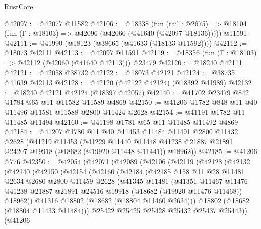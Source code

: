 \begin{lexlean}{RustCore}
\begin{coremodule}
@42097 := @42077 @11582
@42106 := @18338
    (fun (tail : @2675) => @18104 (fun (Γ : @18103) => @42096 (@42060 (@41640 (@42097 @18136)))))
    @11591
@42111 := @41990 (@18123 (@38665 (@41633 (@18133 @11592))))
@42112 := @18073 @42111
@42113 := @42097 @11591
@42119 := @18356 (fun (Γ : @18103) => @42112 (@42060 (@41640 @42113))) @23479
@42120 := @18240 @42111
@42121 := @42058 @38732
@42122 := @18073 @42121
@42124 := @38735 @41639 @42113
@42128 := @42120 (@42122 @42124) (@18392 @41989)
@42132 := @18240 @42121 @42124 (@18397 @42057)
@42140 := @41702 @23479 @842 @1784 @65 @11 @11582 @11589 @4869
@42150 := @41206 @1782 @848 @11 @40 @11496 @11581 @11588 @2800 @11424 @2628
@42154 := @41191 @1782 @11 @11485 @11494
@42160 := @41198 @1781 @65 @11 @11485 @11492 @4869
@42184 := @41207
    @1780
    @11
    @40
    @11453
    @11484
    @11491
    @2800
    @11432
    @2628
    (@41219
      @11453
      (@41229
        @11440
        @11448
        @41238
        @21887
        @21891
        @24207
        @19918
        (@18682 (@19920 @11448 @11441))
        @18962))
@42185 := @41206 @776
@42350 := @42054
    (@42071
      (@42089
        (@42106
          (@42119
            (@42128
              (@42132
                (@42140
                  (@42150
                    (@42154
                      (@42160
                        (@42184
                          (@42185
                            @158
                            @11
                            @28
                            @11481
                            @2634
                            @2680
                            @2800
                            @11459
                            @2628
                            (@41345
                              @11481
                              (@41351
                                @11467
                                @11476
                                @41238
                                @21887
                                @21891
                                @24516
                                @19918
                                (@18682 (@19920 @11476 @11468))
                                @18962))
                            @41316
                            @18802
                            (@18682 (@18804 @11460 @2634)))
                          @18802
                          (@18682 (@18804 @11433 @11484)))
                        @25422
                        @25425
                        @25428
                        @25432
                        @25437
                        @25443))
                    (@41206

\end{coremodule}
\end{lexlean}
